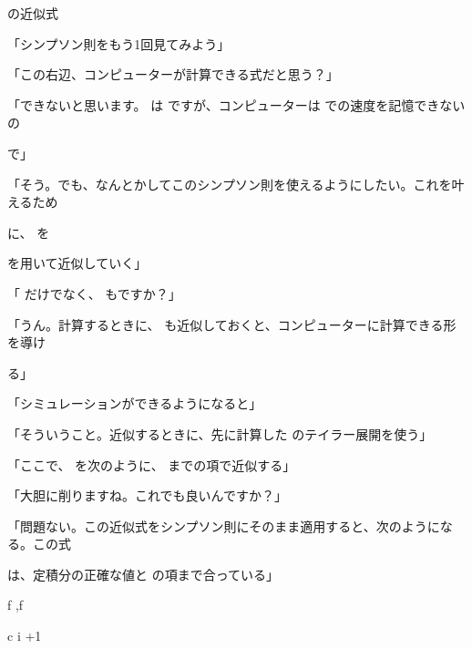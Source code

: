 の近似式\par
「シンプソン則をもう1回⾒てみよう」\par
「この右辺、コンピューターが計算できる式だと思う？」\par
「できないと思います。 は ですが、コンピューターは での速度を記憶できないの\par
で」\par
「そう。でも、なんとかしてこのシンプソン則を使えるようにしたい。これを叶えるため\par
に、 を\par
を⽤いて近似していく」\par
「 だけでなく、 もですか？」\par
「うん。計算するときに、 も近似しておくと、コンピューターに計算できる形を導け\par
る」\par
「シミュレーションができるようになると」\par
「そういうこと。近似するときに、先に計算した のテイラー展開を使う」\par
「ここで、 を次のように、 までの項で近似する」\par
「⼤胆に削りますね。これでも良いんですか？」\par
「問題ない。この近似式をシンプソン則にそのまま適⽤すると、次のようになる。この式\par
は、定積分の正確な値と の項まで合っている」\par
f  ,f\par
c i +1\par
